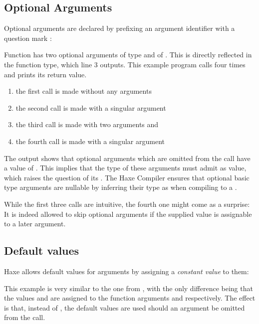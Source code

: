 \documentclass{haxe}
\begin{document}
\subsection{Optional Arguments}
\label{types-function-optional-arguments}

Optional arguments are declared by prefixing an argument identifier with a question mark :

Function  has two optional arguments  of type  and  of . This is directly reflected in the function type, which line 3 outputs. 
This example program calls  four times and prints its return value.

\begin{enumerate}
	\item the first call is made without any arguments
	\item the second call is made with a singular argument 
	\item the third call is made with two arguments  and 
	\item the fourth call is made with a singular argument 
\end{enumerate}
The output shows that optional arguments which are omitted from the call have a value of . This implies that the type of these arguments must admit  as value, which raises the question of its . The Haxe Compiler ensures that optional basic type arguments are nullable by inferring their type as  when compiling to a .

While the first three calls are intuitive, the fourth one might come as a surprise: It is indeed allowed to skip optional arguments if the supplied value is assignable to a later argument.


\subsection{Default values}
\label{types-function-default-values}

Haxe allows default values for arguments by assigning a \emph{constant value} to them:

This example is very similar to the one from , with the only difference being that the values  and  are assigned to the function arguments  and  respectively. The effect is that, instead of , the default values are used should an argument be omitted from the call.
\end{document}
